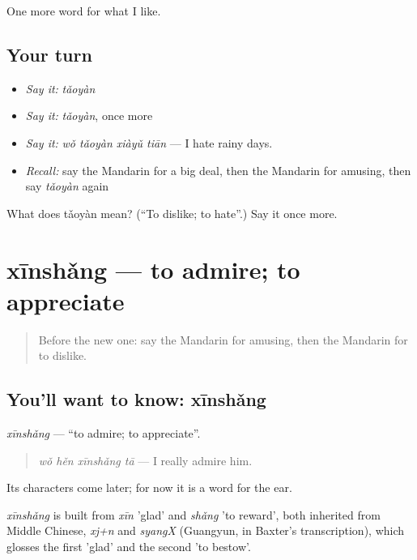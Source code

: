 \begin{grammarlens}[title={What you've built}]
One more word for what I like.
\end{grammarlens}

\subsection*{Your turn}
\begin{itemize}
\raggedright
  \item \emph{Say it:} \emph{tǎoyàn}
  \item \emph{Say it:} \emph{tǎoyàn}, once more
  \item \emph{Say it:} \emph{wǒ tǎoyàn xiàyǔ tiān} — I hate rainy days.
  \item \emph{Recall:} say the Mandarin for a big deal, then the Mandarin for amusing, then say \emph{tǎoyàn} again
\end{itemize}

\begin{tcolorbox}[breakable,colback=teal!4,colframe=teal!35!black,title={Before you move on}]
What does tǎoyàn mean? (\textquotedblleft{}To dislike; to hate\textquotedblright{}.) Say it once more.
\end{tcolorbox}
\section[xīnshǎng]{xīnshǎng — to admire; to appreciate}

\label{lesson:ZH-C277-xinshang}



\begin{quote}
Before the new one: say the Mandarin for amusing, then the Mandarin for to dislike.
\end{quote}

\subsection*{You'll want to know: xīnshǎng}
\emph{xīnshǎng} — \textquotedblleft{}to admire; to appreciate\textquotedblright{}.

\begin{quote}
\emph{wǒ hěn xīnshǎng tā} — I really admire him.
\end{quote}

Its characters come later; for now it is a word for the ear.

\begin{cousinweb}
\emph{xīnshǎng} is built from \emph{xīn} 'glad' and \emph{shǎng} 'to reward', both inherited from Middle Chinese, \emph{xj+n} and \emph{syangX} (Guangyun, in Baxter's transcription), which glosses the first 'glad' and the second 'to bestow'.
\end{cousinweb}

